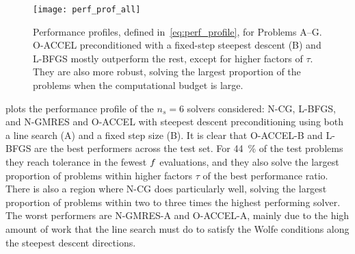 \documentclass[main.tex]{subfiles}
\begin{document}
\begin{figure}[ht]
  \centering
  \texttt{[image: perf\_prof\_all]}
  \caption{Performance profiles, defined in~\eqref{eq:perf_profile},
    for Problems A--G.
    O-ACCEL preconditioned with a fixed-step steepest descent (B) and
    L-BFGS mostly
    outperform the rest, except for higher factors of $\tau$. They are
    also more robust, solving the largest proportion
    of the problems when the computational budget is large.
  }\label{fig:perf_prof_all}
\end{figure}
 plots the performance profile of the $n_s=6$
solvers considered: N-CG, L-BFGS, and N-GMRES and O-ACCEL with
steepest descent preconditioning using both a line search (A) and a
fixed step size (B).  It is clear that O-ACCEL-B and L-BFGS are the
best performers across the test set.  For \SI{44}{\percent} of the
test problems they reach tolerance in the fewest $f$ evaluations,
and they also solve the largest proportion of problems within higher
factors $\tau$ of the best performance ratio.  There is also a region
where N-CG does particularly well, solving the largest proportion of
problems within two to three times the highest performing solver.  The
worst performers are N-GMRES-A and O-ACCEL-A, mainly due to the high
amount of work that the line search must do to satisfy the Wolfe
conditions along the steepest descent directions.
\end{document}
